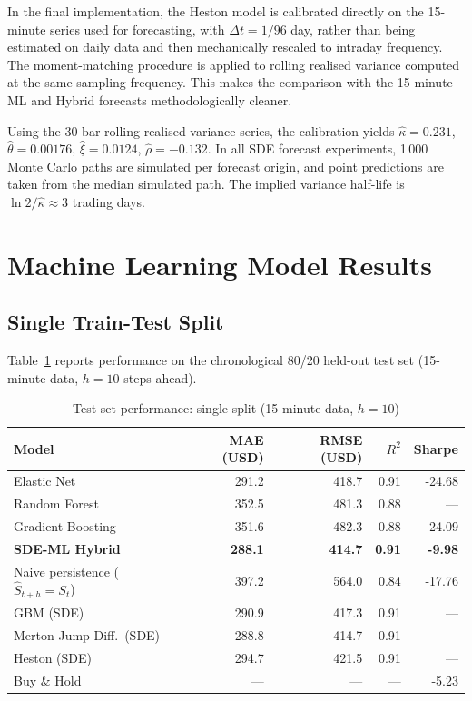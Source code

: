 \documentclass[12pt, a4paper, oneside]{report}
\theoremstyle{plain}
\theoremstyle{definition}
\theoremstyle{remark}
\begin{document}
In the final implementation, the Heston model is calibrated directly on the
15-minute series used for forecasting, with $\Delta t = 1/96$ day, rather than
being estimated on daily data and then mechanically rescaled to intraday
frequency.  The moment-matching procedure is applied to rolling realised
variance computed at the same sampling frequency.  This makes the comparison
with the 15-minute ML and Hybrid forecasts methodologically cleaner.

Using the 30-bar rolling realised variance series, the calibration yields
$\hat\kappa = 0.231$, $\hat\theta = 0.00176$, $\hat\xi = 0.0124$,
$\hat\rho = -0.132$.  In all SDE forecast experiments, 1\,000 Monte Carlo
paths are simulated per forecast origin, and point predictions are taken from
the median simulated path.  The implied variance half-life is
$\ln 2 / \hat\kappa \approx 3$ trading days.

\section{Machine Learning Model Results}

\subsection{Single Train-Test Split}

Table~\ref{tab:ml_results} reports performance on the chronological 80/20
held-out test set (15-minute data, $h = 10$ steps ahead).

\begin{table}[H]
\begin{singlespace}
\fontsize{10}{11}\selectfont
\caption{Test set performance: single split (15-minute data, $h = 10$)}
\label{tab:ml_results}
\begin{tabular}{@{}lrrrr@{}}
\toprule
Model & MAE (USD) & RMSE (USD) & $R^2$ & Sharpe \\
\midrule
Elastic Net             & 291.2  & 418.7  & 0.91 & -24.68 \\
Random Forest           & 352.5  & 481.3  & 0.88 & --- \\
Gradient Boosting       & 351.6  & 482.3  & 0.88 & -24.09 \\
\textbf{SDE-ML Hybrid}  & \textbf{288.1} & \textbf{414.7} & \textbf{0.91} & \textbf{-9.98} \\
Naive persistence ($\hat S_{t+h} = S_t$) & 397.2 & 564.0 & 0.84 & -17.76 \\
\midrule
GBM (SDE)               & 290.9 & 417.3 & 0.91 & --- \\
Merton Jump-Diff.\ (SDE) & 288.8 & 414.7 & 0.91 & --- \\
Heston (SDE)            & 294.7 & 421.5 & 0.91 & --- \\
\midrule
Buy \& Hold             & ---    & ---    & ---   & -5.23 \\
\bottomrule
\end{tabular}
\end{singlespace}
\end{table}
\end{document}
